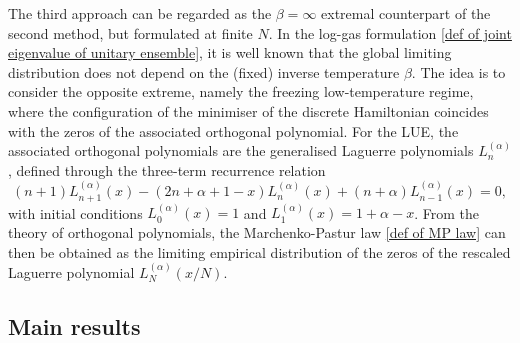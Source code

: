 \documentclass{amsart}
\theoremstyle{plain}
\theoremstyle{remark}
\numberwithin{equation}{section}
\begin{document}
The third approach can be regarded as the $\beta=\infty$ extremal counterpart of the second method, but formulated at finite $N$. In the log-gas formulation \eqref{def of joint eigenvalue of unitary ensemble}, it is well known that the global limiting distribution does not depend on the (fixed) inverse temperature $\beta$. The idea is to consider the opposite extreme, namely the freezing low-temperature regime, where the configuration of the minimiser of the discrete Hamiltonian coincides with the zeros of the associated orthogonal polynomial.  
For the LUE, the associated orthogonal polynomials are the generalised Laguerre polynomials $L_n^{(\alpha)}$, defined through the three-term recurrence relation
\begin{equation}\label{eqn:three term of laguerre}
    (n+1)L_{n+1}^{(\alpha)}(x)-(2n+\alpha +1-x)L_{n}^{(\alpha)}(x)+(n+\alpha)L_{n-1}^{(\alpha)}(x)=0,
\end{equation} 
with initial conditions $L_0^{(\alpha)}(x)=1$ and $L_1^{(\alpha)}(x)=1+\alpha - x$.  
From the theory of orthogonal polynomials, the Marchenko-Pastur law \eqref{def of MP law} can then be obtained as the limiting empirical distribution of the zeros of the rescaled Laguerre polynomial $L_N^{(\alpha)}(x/N)$. 

 




\subsection{Main results}
\end{document}
